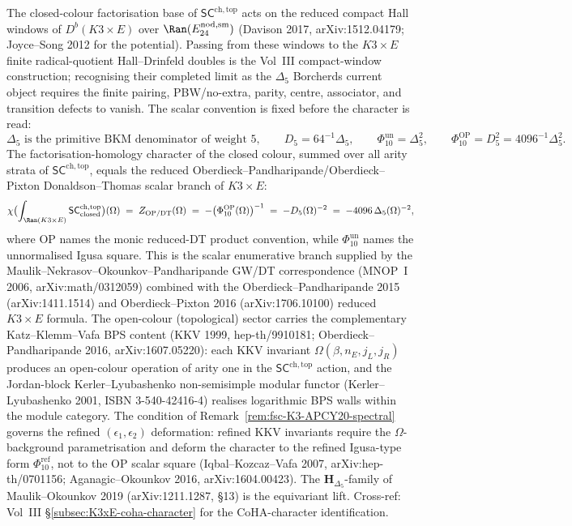 \begin{remark}
\label{rem:fsc-K3xE-GWDT-character}
The closed-colour factorisation base of $\mathsf{SC}^{\mathrm{ch,top}}$
acts on the reduced compact Hall windows of \(D^b(K3 \times E)\) over
\(\Ran(E^{\mathrm{nod,sm}}_{24})\) (Davison 2017, arXiv:1512.04179;
Joyce--Song 2012 for the potential).  Passing from these windows to the
\(K3\times E\) finite radical-quotient Hall--Drinfeld doubles is the
Vol~III compact-window construction; recognising their completed limit
as the \(\Delta_5\) Borcherds current object requires the finite
pairing, PBW/no-extra, parity, centre, associator, and transition
defects to vanish. The scalar
convention is fixed before the character is read:
\[
 \Delta_5 \text{ is the primitive BKM denominator of weight }5,\qquad
 D_5=64^{-1}\Delta_5,\qquad
 \Phi_{10}^{\mathrm{un}}=\Delta_5^2,\qquad
 \Phi_{10}^{\mathrm{OP}}=D_5^2=4096^{-1}\Delta_5^2 .
\]
The factorisation-homology character of the closed colour, summed over
all arity strata of $\mathsf{SC}^{\mathrm{ch,top}}$, equals the reduced
Oberdieck--Pandharipande/Oberdieck--Pixton
Donaldson--Thomas scalar branch of $K3 \times E$:
\[
 \chi\bigl(\int_{\Ran(K3 \times E)}
 \mathsf{SC}^{\mathrm{ch,top}}_{\mathrm{closed}}\bigr)(\Omega)
 \;=\; Z_{\mathrm{OP/DT}}(\Omega)
 \;=\; -\bigl(\Phi_{10}^{\mathrm{OP}}(\Omega)\bigr)^{-1}
 \;=\; -D_5(\Omega)^{-2}
 \;=\; -4096\,\Delta_5(\Omega)^{-2},
\]
where OP names the monic reduced-DT product convention, while
$\Phi_{10}^{\mathrm{un}}$ names the unnormalised Igusa square. This is
the scalar enumerative branch supplied by the
Maulik--Nekrasov--Okounkov--Pandharipande GW/DT correspondence
(MNOP~I 2006, arXiv:math/0312059) combined with the
Oberdieck--Pandharipande 2015 (arXiv:1411.1514) and
Oberdieck--Pixton 2016 (arXiv:1706.10100) reduced $K3 \times E$
formula. The
open-colour (topological) sector carries the complementary
Katz--Klemm--Vafa BPS content (KKV 1999, hep-th/9910181;
Oberdieck--Pandharipande 2016, arXiv:1607.05220): each KKV invariant
$\Omega(\beta, n_E, j_L, j_R)$ produces an open-colour operation of
arity one in the $\mathsf{SC}^{\mathrm{ch,top}}$ action, and the
Jordan-block Kerler--Lyubashenko non-semisimple modular functor
(Kerler--Lyubashenko 2001, ISBN 3-540-42416-4) realises logarithmic
BPS walls within the module category. The condition of
Remark~\ref{rem:fsc-K3-APCY20-spectral} governs the refined
$(\epsilon_1, \epsilon_2)$ deformation: refined KKV invariants
require the $\Omega$-background parametrisation and deform
the character to the refined Igusa-type form
$\Phi_{10}^{\mathrm{ref}}$, not to the OP scalar square
(Iqbal--Kozcaz--Vafa 2007,
arXiv:hep-th/0701156; Aganagic--Okounkov 2016, arXiv:1604.00423). The
$\mathbf{H}_{\Delta_5}$-family of Maulik--Okounkov 2019 (arXiv:1211.1287,
\S13) is the equivariant lift. Cross-ref: Vol~III
\S\ref{subsec:K3xE-coha-character} for the CoHA-character
identification.
\end{remark}
